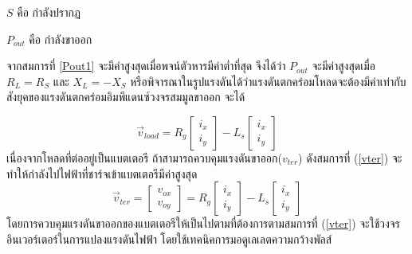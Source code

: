 \documentclass[11pt,a4paper]{article}
\begin{document}
$S$ คือ กำลังปรากฎ

$P_{out}$ คือ กำลังขาออก

จากสมการที่ {\ref{Pout1}} จะมีค่าสูงสุดเมื่อพจน์ตัวหารมีค่าต่ำที่สุด จึงได้ว่า $P_{out}$ จะมีค่าสูงสุดเมื่อ $R_{L} = R_{S}$ และ $X_{L} = -X_{S}$ หรือพิจารณาในรูปแรงดันได้ว่าแรงดันตกคร่อมโหลดจะต้องมีค่าเท่ากับสังยุคของแรงดันตกคร่อมอิมพีแดนซ์วงจรสมมูลขาออก จะได้

\begin{equation}
    \vec{v}_{load}  = R_{g}
    \begin{bmatrix}
        i_{x} \\i_{y}
    \end{bmatrix} - L_{s}
    \begin{bmatrix}
        i_{x} \\i_{y}
    \end{bmatrix}
\end{equation}
เนื่องจากโหลดที่ต่ออยู่เป็นแบตเตอรี ถ้าสามารถควบคุมแรงดันขาออก($v_{ter}$) ดังสมการที่ (\ref{vter}) จะทำให้กำลังไปไฟฟ้าที่ชาร์จเข้าแบตเตอรีมีค่าสูงสุด
\begin{equation}\label{vter}
    \vec{v}_{ter} =
    \begin{bmatrix}
        v_{ox} \\v_{oy}
    \end{bmatrix} = R_{g}
    \begin{bmatrix}
        i_{x} \\i_{y}
    \end{bmatrix} - L_{s}
    \begin{bmatrix}
        i_{x} \\i_{y}
    \end{bmatrix}
\end{equation}
โดยการควบคุมแรงดันขาออกของแบตเตอรีให้เป็นไปตามที่ต้องการตามสมการที่ (\ref{vter}) จะใช้วงจรอินเวอร์เตอร์ในการแปลงแรงดันไฟฟ้า โดยใช้เทคนิคการมอดูเลเลตความกว้างพัลส์
\end{document}
